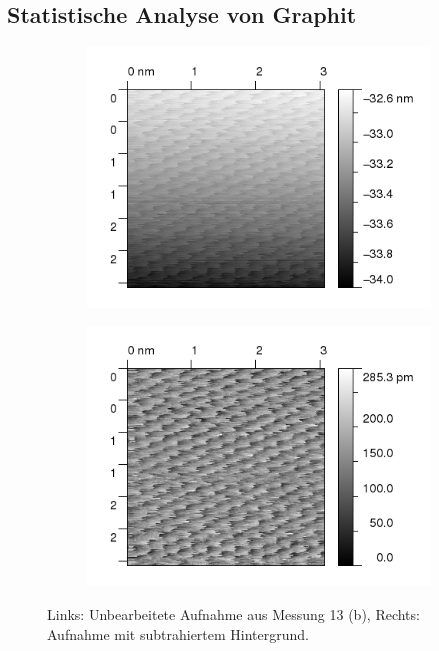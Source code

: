 \clearpage
\subsection{Statistische Analyse von Graphit}

\begin{figure}
    \begin{subfigure}[b]{\picwidth}
    \includegraphics[width=\textwidth]{pics/fourier1}
    \end{subfigure}\qquad
    \begin{subfigure}[b]{\picwidth}
        \includegraphics[width=\textwidth]{pics/fourier2}
    \end{subfigure}
    \caption{Links: Unbearbeitete Aufnahme aus Messung 13 (b), Rechts: Aufnahme mit
    subtrahiertem Hintergrund.}
    \label{fig:fourier12}
\end{figure}



